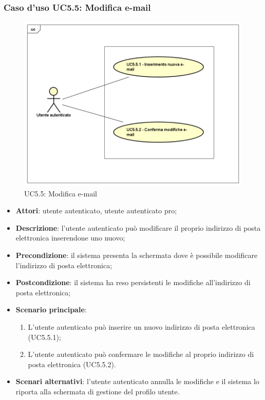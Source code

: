 \subsubsection{Caso d'uso UC5.5: Modifica e-mail}
\label{UC5.5}
\begin{figure}[h]
	\centering
	\includegraphics[scale=0.5,keepaspectratio]{UML/UC5_5.png}
	\caption{UC5.5: Modifica e-mail}
\end{figure}

\begin{itemize}
	\item \textbf{Attori}: utente autenticato, utente autenticato pro;
	\item \textbf{Descrizione}: l'utente autenticato può modificare il proprio indirizzo di posta elettronica inserendone uno nuovo;
	\item \textbf{Precondizione}: il sistema presenta la schermata dove è possibile modificare l'indirizzo di posta elettronica;
	\item \textbf{Postcondizione}: il sistema ha reso persistenti le modifiche all'indirizzo di posta elettronica;
	\item \textbf{Scenario principale}:
		\begin{enumerate}
			\item L'utente autenticato può inserire un nuovo indirizzo di posta elettronica (UC5.5.1);
			\item L'utente autenticato può confermare le modifiche al proprio indirizzo di posta elettronica (UC5.5.2).
		\end{enumerate}
	\item \textbf{Scenari alternativi}: l'utente autenticato annulla le modifiche e il sistema lo riporta alla schermata di gestione del profilo utente.
\end{itemize}

